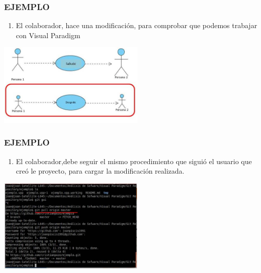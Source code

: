 \documentclass[8pt]{beamer}
\begin{document}
\begin{frame}
\frametitle{EJEMPLO}
\begin{enumerate}[21. ]
    \item El colaborador, hace una modificación, para comprobar que podemos trabajar con Visual Paradigm\\
\end{enumerate}
\begin{center}
\includegraphics[width=7cm]{img/b32}\\
\fontsize{6}{1}
\end{center}
\end{frame}

\begin{frame}
\frametitle{EJEMPLO}
\begin{enumerate}[22. ]
    \item El colaborador,debe seguir el mismo procedimiento que siguió el usuario que creó le proyecto, para cargar la modificación realizada.\\
\end{enumerate}
\begin{center}
\includegraphics[width=7cm]{img/b33}\\
\fontsize{6}{1}
\end{center}
\end{frame}
\end{document}
